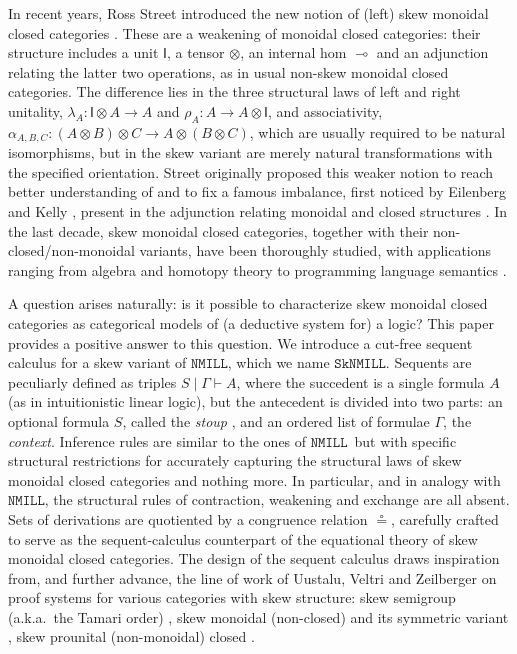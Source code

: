 \documentclass[copyright,creativecommons]{eptcs}
\theoremstyle{definition}
\newcommand{\ot}{\otimes}
\newcommand{\lolli}{\multimap}
\newcommand{\I}{\mathsf{I}}
\newcommand{\NMILL}{$\mathtt{NMILL}$}
\newcommand{\SkNMILL}{$\mathtt{SkNMILL}$}
\begin{document}
In recent years, Ross Street introduced the new notion of (left) skew monoidal closed categories \cite{street:skew-closed:2013}. These are a weakening of monoidal closed categories: their structure includes a unit $\I$, a tensor $\ot$, an internal hom $\lolli$ and an adjunction relating the latter two operations, as in usual non-skew monoidal closed categories. The difference lies in the three structural laws of left and right unitality, $\lambda_A : \I \ot A \to A$ and $\rho_A : A \to A \ot \I$, and associativity, $\alpha_{A,B,C} : (A \ot B) \ot C \to A \ot (B \ot C)$, which are usually required to be natural isomorphisms, but in the skew variant are merely natural transformations with the specified orientation. Street originally proposed this weaker notion to reach better understanding of and to fix a famous imbalance, first noticed by Eilenberg and Kelly \cite{eilenberg:closed:1966}, present in the adjunction relating monoidal and closed structures \cite{street:skew-closed:2013,uustalu:eilenberg-kelly:2020}. In the last decade, skew monoidal closed categories, together with their non-closed/non-monoidal variants, have been thoroughly studied, with applications ranging from algebra and homotopy theory to programming language semantics \cite{szlachanyi:skew-monoidal:2012,lack:skew:2012,lack:triangulations:2014,altenkirch:monads:2014,buckley:catalan:2015,bourke:skew:2017,bourke:skew:2018,tomita:realizability:21}.

A question arises naturally: is it possible to characterize skew monoidal closed categories as categorical models of (a deductive system for) a logic?
This paper provides a positive answer to this question. We introduce a cut-free sequent calculus for a skew variant of \NMILL, which we name \SkNMILL. Sequents are peculiarly defined as triples $S \mid \Gamma \vdash A$, where the succedent is a single formula $A$ (as in intuitionistic linear logic), but the antecedent is divided into two parts: an optional formula $S$, called the \emph{stoup} \cite{girard:constructive:91}, and an ordered list of formulae $\Gamma$, the \emph{context}. Inference rules are similar to the ones of \NMILL\ but with specific structural restrictions for accurately capturing the structural laws of skew monoidal closed categories and nothing more. In particular, and in analogy with \NMILL, the structural rules of contraction, weakening and exchange are all absent. Sets of derivations are quotiented by a congruence relation $\circeq$, carefully crafted to serve as the sequent-calculus counterpart of the equational theory of skew monoidal closed categories. The design of the sequent calculus draws inspiration from, and further advance, the line of work of Uustalu, Veltri and Zeilberger on proof systems for various categories with skew structure: skew semigroup (a.k.a.\ the Tamari order) \cite{zeilberger:semiassociative:19}, skew monoidal (non-closed) \cite{uustalu:sequent:2021,uustalu:proof:nodate} and its symmetric variant \cite{veltri:coherence:2021}, skew prounital (non-monoidal) closed \cite{uustalu:deductive:nodate}.
\end{document}
